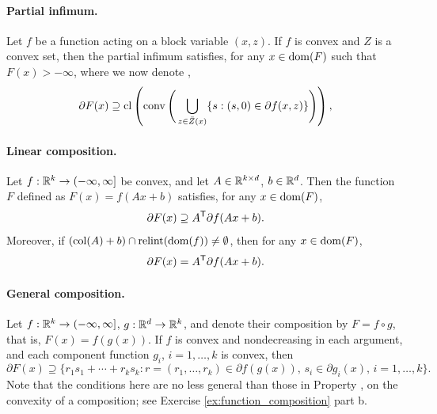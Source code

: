 \paragraph{Partial infimum.}

Let $f$ be a function acting on a block variable $(x,z)$. If $f$ is convex and
$Z$ is a convex set, then the partial infimum  satisfies, for any $x \in \operatorname{dom}(F)$ such that $F(x) > -\infty$, 
where we now denote , 
\[
\partial F(x) \supseteq \operatorname{cl}\left( \operatorname{conv}\Bigg( \bigcup_{z \in \bar{Z}(x)} 
\{ s : (s, 0) \in \partial f(x, z) \} \Bigg)\right),  
\]

\paragraph{Linear composition.}

Let $f : \mathbb{R}^k \to (-\infty, \infty]$ be convex, and let $A \in \mathbb{R}^{k \times d}$,
$b \in \mathbb{R}^d$. Then the function $F$ defined as $F(x) = f(Ax+b)$ satisfies, for 
any $x \in \operatorname{dom}(F)$, 
\[
\partial F(x) \supseteq A^{\mathsf{T}} \partial f(Ax + b).
\]
Moreover, if $(\operatorname{col}(A) + b) \cap \operatorname{relint}(\operatorname{dom}(f)) \not= \emptyset$, then for any  
$x \in \operatorname{dom}(F)$,  
\[
\partial F(x) = A^{\mathsf{T}} \partial f(Ax + b).
\]


\paragraph{General composition.}

Let $f : \mathbb{R}^k \to (-\infty, \infty]$, $g : \mathbb{R}^d \to \mathbb{R}^k$, and denote their
composition by $F = f \circ g$, that is, $F(x) = f(g(x))$. If $f$ is convex and
nondecreasing in each argument, and each component function $g_i$,
$i=1,\ldots,k$ is convex, then  
\[
\partial F(x) \supseteq \{ r_1 s_1 + \cdots + r_k s_k : r = (r_1, \ldots, r_k)
\in \partial f(g(x)), \, s_i \in \partial g_i(x), \, i=1,\ldots,k \big\}.
\]
Note that the conditions here are no less general than those in Property
, on the convexity of a composition; see
Exercise \ref{ex:function_composition} part b.

\medskip

